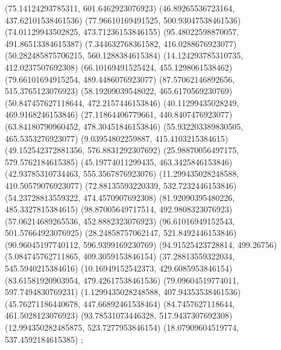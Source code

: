 {{{		(75.14124293785311, 601.6462923076923)
		(46.89265536723164, 437.62101538461536)
		(77.96610169491525, 500.93047538461536)
		(74.01129943502825, 473.71236153846155)
		(95.48022598870057, 491.86513384615387)
		(7.344632768361582, 416.0288676923077)
		(50.282485875706215, 560.1288384615384)
		(14.124293785310735, 412.0237507692308)
		(66.10169491525424, 455.1298061538462)
		(79.66101694915254, 489.4486076923077)
		(87.57062146892656, 515.3765123076923)
		(58.19209039548022, 465.6170569230769)
		(50.847457627118644, 472.2157446153846)
		(40.11299435028249, 469.9168246153846)
		(27.11864406779661, 440.8407476923077)
		(63.84180790960452, 478.30451846153846)
		(55.932203389830505, 465.5353276923077)
		(9.03954802259887, 415.4103215384615)
		(49.152542372881356, 576.8831292307692)
		(25.98870056497175, 579.5762184615385)
		(45.19774011299435, 463.3425846153846)
		(42.93785310734463, 555.3567876923076)
		(11.299435028248588, 410.50579076923077)
		(72.88135593220339, 532.7232446153846)
		(54.23728813559322, 474.4570907692308)
		(81.92090395480226, 485.3327815384615)
		(98.87005649717514, 492.9808323076923)
		(57.06214689265536, 452.8882323076923)
		(96.61016949152543, 501.57664923076925)
		(28.24858757062147, 521.8492446153846)
		(90.96045197740112, 596.9399169230769)
		(94.91525423728814, 499.26756)
		(5.084745762711865, 409.3059153846154)
		(37.28813559322034, 545.5940215384616)
		(10.16949152542373, 429.6085953846154)
		(83.61581920903954, 479.42617538461536)
		(79.09604519774011, 597.7494830769231)
		(1.1299435028248588, 407.94353538461536)
		(45.76271186440678, 447.66892461538464)
		(84.7457627118644, 461.5028123076923)
		(93.78531073446328, 517.9437307692308)
		(12.994350282485875, 523.7277953846154)
		(18.07909604519774, 537.4592184615385)
	};

}}
